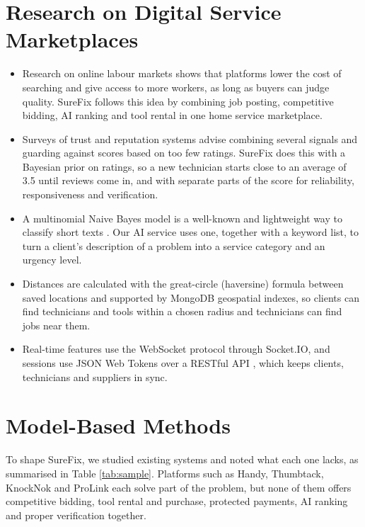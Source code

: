 \documentclass[A4paper,12pt]{report}
\theoremstyle{plain}
\theoremstyle{definition}
\theoremstyle{remark}
\numberwithin{equation}{section}
\begin{document}
\section{Research on Digital Service Marketplaces}

\begin{itemize}
        \item Research on online labour markets \cite{3} shows that platforms lower the cost of searching and give access to more workers, as long as buyers can judge quality. SureFix follows this idea by combining job posting, competitive bidding, AI ranking and tool rental in one home service marketplace.
    \item Surveys of trust and reputation systems \cite{4,5} advise combining several signals and guarding against scores based on too few ratings. SureFix does this with a Bayesian prior on ratings, so a new technician starts close to an average of 3.5 until reviews come in, and with separate parts of the score for reliability, responsiveness and verification.
    \item A multinomial Naive Bayes model is a well-known and lightweight way to classify short texts \cite{8}. Our AI service uses one, together with a keyword list, to turn a client's description of a problem into a service category and an urgency level.
    \item Distances are calculated with the great-circle (haversine) formula \cite{9} between saved locations and supported by MongoDB geospatial indexes, so clients can find technicians and tools within a chosen radius and technicians can find jobs near them.
    \item Real-time features use the WebSocket protocol \cite{10} through Socket.IO, and sessions use JSON Web Tokens \cite{11} over a RESTful API \cite{12}, which keeps clients, technicians and suppliers in sync.
    
\end{itemize}
\section{Model-Based Methods}

To shape SureFix, we studied existing systems and noted what each one lacks, as summarised in Table \ref{tab:sample}. Platforms such as Handy, Thumbtack, KnockNok and ProLink each solve part of the problem, but none of them offers competitive bidding, tool rental and purchase, protected payments, AI ranking and proper verification together.
\end{document}
